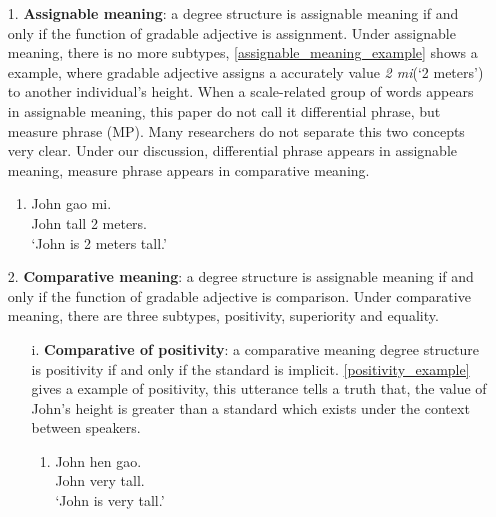 \documentclass{ctexart}
\begin{document}
\begin{itemize}

    \item[1.] \textbf{Assignable meaning}: a degree structure is assignable meaning if and only if the function of gradable adjective is assignment. Under assignable meaning, there is no more subtypes, \ref{assignable_meaning_example} shows a example, where gradable adjective assigns a accurately value \textit{2 mi}(`2 meters') to another individual's height. When a scale-related group of words appears in assignable meaning, this paper do not call it differential phrase, but measure phrase (MP). Many researchers do not separate this two concepts very clear. Under our discussion, differential phrase appears in assignable meaning, measure phrase appears in comparative meaning. 
    
    \begin{enumerate}
        \item \label{assignable_meaning_example}
        John gao  mi.\\
        John tall 2 meters. \\
        `John is 2 meters tall.'
    \end{enumerate}
    
    \item[2.] \textbf{Comparative meaning}: a degree structure is assignable meaning if and only if the function of gradable adjective is comparison. Under comparative meaning, there are three subtypes, positivity, superiority and equality. 
    
    \begin{itemize}

        \item[i.] \textbf{Comparative of positivity}: a comparative meaning degree structure is positivity if and only if the standard is implicit. \ref{positivity_example} gives a example of positivity, this utterance tells a truth that, the value of John's height is greater than a standard which exists under the context between speakers. 
        
        \begin{enumerate}
            \item \label{positivity_example}
            John hen gao. \\
            John very tall. \\
            `John is very tall.'
        \end{enumerate}
        

\end{itemize}
\end{itemize}
\end{document}
